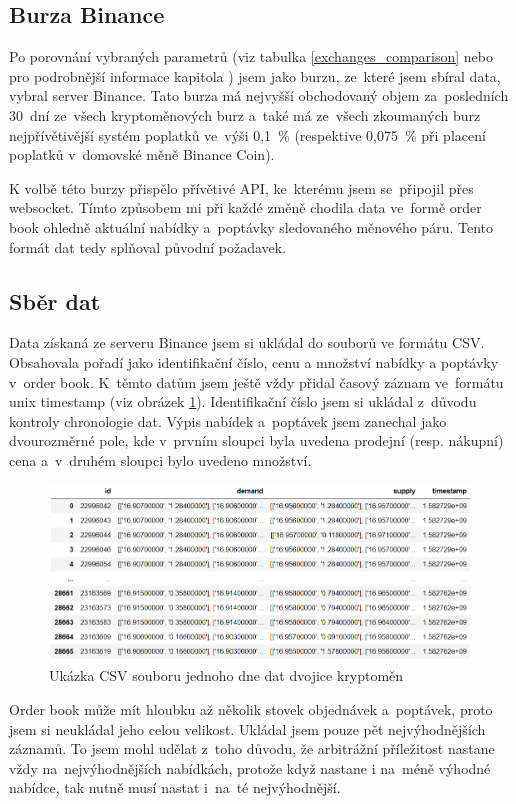 \documentclass[thesis=B,czech]{FITthesis}[2019/03/21]
\begin{document}
\subsection{Burza Binance}
Po porovnání vybraných parametrů (viz tabulka \ref{exchanges_comparison} nebo pro podrobnější informace kapitola ) jsem jako burzu, ze~které jsem sbíral data, vybral server Binance. Tato burza má nejvyšší obchodovaný objem za~posledních 30~dní ze~všech kryptoměnových burz \cite{coinmarketcap} a~také má ze~všech zkoumaných burz nejpřívětivější systém poplatků ve~výši 0,1~\% (respektive 0,075~\% při placení poplatků v~domovské měně Binance Coin).

K volbě této burzy přispělo přívětivé API, ke~kterému jsem se~připojil přes websocket. \cite{BinanceApi} Tímto způsobem mi při každé změně chodila data ve~formě order book ohledně aktuální nabídky a~poptávky sledovaného měnového páru. Tento formát dat tedy splňoval původní požadavek. \cite{BinanceApi}

\subsection{Sběr dat}
Data získaná ze serveru Binance jsem si ukládal do souborů ve formátu CSV. Obsahovala pořadí jako identifikační číslo, cenu a množství nabídky a poptávky v~order book. K~těmto datům jsem ještě vždy přidal časový záznam ve~formátu unix timestamp (viz obrázek \ref{csv_data}). Identifikační číslo jsem si ukládal z~důvodu kontroly chronologie dat. Výpis nabídek a~poptávek jsem zanechal jako dvourozměrné pole, kde v~prvním sloupci byla uvedena prodejní (resp. nákupní) cena a~v~druhém sloupci bylo uvedeno množství.

\begin{figure}\centering
	\includegraphics[width=1\textwidth]{images/csv_data.PNG}
	\caption{Ukázka CSV souboru jednoho dne dat dvojice kryptoměn}\label{csv_data}
\end{figure}
Order book může mít hloubku až několik stovek objednávek a~poptávek, proto jsem si neukládal jeho celou velikost. Ukládal jsem pouze pět nejvýhodnějších záznamů. To jsem mohl udělat z~toho důvodu, že arbitrážní příležitost nastane vždy na~nejvýhodnějších nabídkách, protože když nastane i na~méně výhodné nabídce, tak nutně musí nastat i~na~té nejvýhodnější. 
\end{document}

